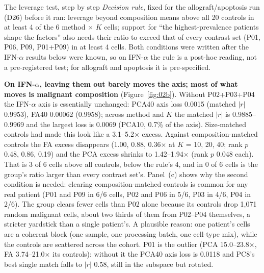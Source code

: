 \begin{explainbox}{The leverage test, step by step}
\emph{Decision rule}, fixed for the allograft/apoptosis run (D26) before it ran: leverage beyond composition means above all 20 controls in at least 4 of the 6 method $\times$ $K$ cells; support for ``the highest-prevalence patients shape the factors'' also needs their ratio to exceed that of every contrast set (P01, P06, P09, P01+P09) in at least 4 cells. Both conditions were written after the IFN-$\alpha$ results below were known, so on IFN-$\alpha$ the rule is a post-hoc reading, not a pre-registered test; for allograft and apoptosis it is pre-specified.
\end{explainbox}

\textbf{On IFN-$\alpha$, leaving them out barely moves the axis; most of what moves is malignant composition} (Figure~\ref{fig:02b}).
Without P02+P03+P04 the IFN-$\alpha$ axis is essentially unchanged: PCA40 axis loss 0.0015 (matched $|r|$ 0.9953), FA40 0.00062 (0.9958); across method and $K$ the matched $|r|$ is 0.9885--0.9969 and the largest loss is 0.0069 (PCA10, 0.7\% of the axis). Size-matched controls had made this look like a 3.1--5.2$\times$ excess. Against composition-matched controls the FA excess disappears (1.00, 0.88, 0.36$\times$ at $K$ = 10, 20, 40; rank $p$ 0.48, 0.86, 0.19) and the PCA excess shrinks to 1.42--1.94$\times$ (rank $p$ 0.048 each). That is 3 of 6 cells above all controls, below the rule's 4, and in 0 of 6 cells is the group's ratio larger than every contrast set's. Panel~(c) shows why the second condition is needed: clearing composition-matched controls is common for any real patient (P01 and P09 in 6/6 cells, P02 and P06 in 5/6, P03 in 4/6, P04 in 2/6). The group clears fewer cells than P02 alone because its controls drop 1,071 random malignant cells, about two thirds of them from P02--P04 themselves, a stricter yardstick than a single patient's. A plausible reason: one patient's cells are a coherent block (one sample, one processing batch, one cell-type mix), while the controls are scattered across the cohort. P01 is the outlier (PCA 15.0--23.8$\times$, FA 3.74--21.0$\times$ its controls): without it the PCA40 axis loss is 0.0118 and PC8's best single match falls to $|r|$ 0.58, still in the subspace but rotated. 

